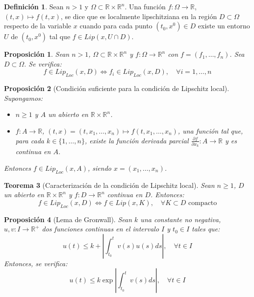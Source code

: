 \documentclass{report}
\newtheorem{theorem}{Teorema}[chapter]
\newtheorem{proposition}[theorem]{Proposición}
\theoremstyle{remark}
\theoremstyle{remark}
\theoremstyle{remark}
\theoremstyle{definition}
\newtheorem{definition}{Definición}[chapter]
\theoremstyle{definition}
\theoremstyle{definition}
\begin{document}
\begin{definition}
    Sean $n > 1$ y $\Omega \subset \mathbb{R} \times \mathbb{R}^n$.
    Una función $f: \Omega \to \mathbb{R}$, $(t, x) \mapsto f(t, x)$, se dice que es localmente lipschitziana en la región $D \subset \Omega$ respecto de la variable $x$ cuando para cada punto $(t_0, x^0) \in D$ existe un entorno $U$ de $(t_0, x^0)$ tal que $f \in Lip(x, U \cap D)$.
\end{definition}

\begin{proposition}
    Sean $n > 1$, $\Omega \subset \mathbb{R} \times \mathbb{R}^n$ y $f: \Omega \to \mathbb{R}^n$ con $f = (f_1, \dots, f_n)$.
    Sea $D \subset \Omega$.
    Se verifica:
    $$f \in Lip_{Loc}(x, D) \Leftrightarrow f_i \in Lip_{Loc}(x, D), \quad \forall i = 1, \dots, n$$
\end{proposition}

\begin{proposition}[Condición suficiente para la condición de Lipschitz local]
    Supongamos:
    \begin{itemize}
        \item $n \geq 1$ y $A$ un abierto en $\mathbb{R} \times \mathbb{R}^n$.
        \item $f: A \to \mathbb{R}$, $(t, x) = (t, x_1, \dots, x_n) \mapsto f(t, x_1, \dots, x_n)$, una función tal que, para cada $k \in \{1, \dots, n\}$, existe la función derivada parcial $\frac{\partial f}{\partial x_k}: A \to \mathbb{R}$ y es continua en $A$.
    \end{itemize}
    Entonces $f \in Lip_{Loc}(x, A)$, siendo $x = (x_1, \dots, x_n)$.
\end{proposition}

\begin{theorem}[Caracterización de la condición de Lipschitz local]
    Sean $n \geq 1$, $D$ un abierto en $\mathbb{R} \times \mathbb{R}^n$ y $f: D \to \mathbb{R}^n$ continua en $D$.
    Entonces:
    $$f \in Lip_{Loc}(x, D) \Leftrightarrow f \in Lip(x, K), \quad \forall K \subset D \text{ compacto}$$
\end{theorem}

\begin{proposition}[Lema de Gronwall]
    Sean $k$ una constante no negativa, $u, v: I \to \mathbb{R}^+$ dos funciones continuas en el intervalo $I$ y $t_0 \in I$ tales que:
    $$u(t) \leq k + \left| \int_{t_0}^t v(s)u(s)ds \right|, \quad \forall t \in I$$
    Entonces, se verifica:
    $$u(t) \leq k\exp\left| \int_{t_0}^t v(s)ds \right|, \quad \forall t \in I$$
\end{proposition}
\end{document}
